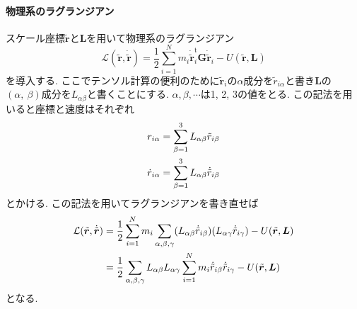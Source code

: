 \paragraph{物理系のラグランジアン}
スケール座標$\tilde{\bm{r}}$と$\bm{L}$を用いて物理系のラグランジアン
\begin{equation}
  \mathcal{L} (\tilde{\bm{r}}, \dot{\tilde{\bm{r}}})
  =
  \frac{1}{2}
  \sum_{i=1}^{N}
  m_{i} \dot{\tilde{\bm{r}}}_{i}^{\mathrm{t}} \bm{G} \dot{\tilde{\bm{r}}}_{i}
  -
  U(\tilde{\bm{r}}, \bm{L})
\end{equation}
を導入する.
ここでテンソル計算の便利のために$\tilde{\bm{r}}_{i}$の$\alpha$成分を$\tilde{r}_{i\alpha}$と書き$\bm{L}$の$(\alpha,~\beta)$成分を$L_{\alpha \beta}$と書くことにする. 
$\alpha,\beta,\cdots$は1, 2, 3の値をとる. 
この記法を用いると座標と速度はそれぞれ
\begin{align}
  r_{i \alpha}
 &=
  \sum_{\beta = 1}^{3} L_{\alpha \beta} \tilde{r}_{i\beta}
  \\
  \notag
  \dot{r}_{i \alpha}
 &=
  \sum_{\beta = 1}^{3} L_{\alpha \beta} \dot{\tilde{r}}_{i\beta}
\end{align}
とかける. 
この記法を用いてラグランジアンを書き直せば
\begin{align}
  \mathcal{L} (\tilde{\bm{r}}, \dot{\tilde{\bm{r}}})
 &=
  \frac{1}{2}
  \sum_{i=1}^{N} m_{i}
  \sum_{\alpha,\beta,\gamma}
  (L_{\alpha\beta}\dot{\tilde{r}}_{i\beta})
  (L_{\alpha\gamma}\dot{\tilde{r}}_{i\gamma})
  -
  U(\tilde{\bm{r}}, \bm{L})
  \\
  \notag
 &=
  \frac{1}{2}
  \sum_{\alpha,\beta,\gamma}
  L_{\alpha\beta} L_{\alpha\gamma}
  \sum_{i=1}^{N} m_{i}
  \dot{\tilde{r}}_{i\beta} \dot{\tilde{r}}_{i\gamma}
  -
  U(\tilde{\bm{r}}, \bm{L})
\end{align}
となる. 

